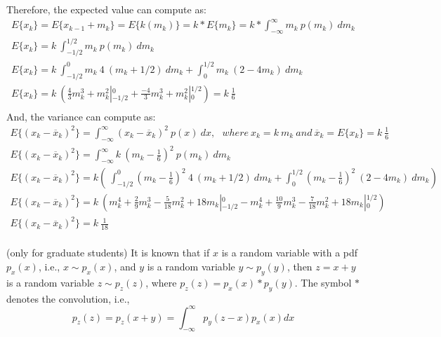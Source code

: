 \documentclass{article}
\begin{document}
Therefore, the expected value can compute as:
\begin{equation}
	\begin{array}{l}
  		E\{x_{k}\}=E\{x_{k-1}+m_k\}=E\{k(m_k)\}=k*E\{m_k\}=k*\int_{-\infty}^\infty m_k\ p(m_k)\ dm_k \\
  		E\{x_{k}\}=k\ \int_{-1/2}^{1/2} m_k\ p(m_k)\ dm_k\\
		E\{x_{k}\}=k\ \int_{-1/2}^{0} m_k\ 4\ (m_k+1/2)\ dm_k+\int_{0}^{1/2} m_k\ (2-4m_k)\ dm_k \\
  		E\{x_{k}\}=k\ (\frac{4}{3}m_k^3+m_k^2 \left| {_{-1/2}^{0} } \right.+\frac{-4}{3}m_k^3+m_k^2 \left| {_{0}^{1/2} } \right.)=k\ \frac{1}{6}\\
	\end{array}
\end{equation}
And, the variance can compute as:
\begin{equation}
	\begin{array}{l}
  		E\{(x_k-\overline{x}_k)^2\}=\int_{-\infty}^\infty (x_k-\overline{x}_k)^2\ p(x)\ dx, \ \ \ where\ x_k=k\ m_k\ and\ \overline{x}_k=E\{x_{k}\}=k\ \frac{1}{6} \\
		E\{(x_k-\overline{x}_k)^2\}=\int_{-\infty}^\infty k\ (m_k-\frac{1}{6})^2\ p(m_k)\ dm_k\\
		E\{(x_k-\overline{x}_k)^2\}=k(\ \int_{-1/2}^{0} (m_k-\frac{1}{6})^2\ 4\ (m_k+1/2)\ dm_k+\int_{0}^{1/2} (m_k-\frac{1}{6})^2\ (2-4m_k)\ dm_k) \\
		E\{(x_k-\overline{x}_k)^2\}=k\ (m_k^4+\frac{2}{9}m_k^3-\frac{5}{18}m_k^2+18m_k \left| {_{-1/2}^{0} } \right.-m_k^4+\frac{10}{9}m_k^3-\frac{7}{18}m_k^2+18m_k \left| {_{0}^{1/2} } \right.)\\
		E\{(x_k-\overline{x}_k)^2\}=k\ \frac{1}{18} \\
	\end{array}
\end{equation}

 (only for graduate students) It is known that if 
$x$ is a random variable with a pdf $p_x(x)$, i.e., $x \sim p_x(x)$,  
and $y$ is a random variable $y \sim p_y(y)$, then 
$z=x+y$ is a random variable $z \sim p_z(z)$, where $p_z(z)=p_x(x)*p_y(y)$. 
The symbol  $*$ denotes the convolution, i.e.,
\begin{equation}
  p_z(z)=p_z(x+y)=\int_{-\infty}^\infty p_y(z-x)p_x(x)dx
\end{equation}
\end{document}
